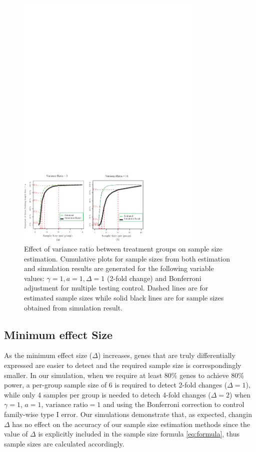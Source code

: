 \documentclass{bioinfo}
\begin{document}
\begin{figure}[h]
  \centerline{\includegraphics*[width=3.5in]{ResVarF.pdf}}
  \caption[Effect of variance ratio between treatment groups on sample size estimation]
  {Effect of variance ratio between treatment groups on sample size estimation.
    Cumulative plots for sample sizes from both estimation and simulation
    results are generated for the following variable values: $\gamma = 1, a = 1, \Delta = 1$ (2-fold
    change) and Bonferroni adjustment for multiple testing control. Dashed lines are for estimated sample sizes
    while solid black lines are for sample sizes obtained from simulation result.}
  \label{fig:ResVar}
\end{figure}

\subsection{Minimum effect Size}

As the minimum effect size ($\Delta$) increases, genes that are
truly differentially expressed are easier to detect and the required
sample size is correspondingly smaller.  In our simulation, when we
require at least 80\% genes to achieve 80\% power, a per-group
sample size of 6 is required to detect 2-fold changes ($\Delta =
1$), while only 4 samples per group is needed to detech 4-fold
changes ($\Delta = 2$) when $\gamma=1$, $a=1$, $\text{variance
ratio}=1$ and using the Bonferroni correction to control family-wise
type I error. Our simulations demonstrate that, as expected, changin
$\Delta$ has no effect on the accuracy of our sample size estimation
methods since the value of $\Delta$ is explicitly included in the
sample size formula \ref{eq:formula}, thus sample sizes are
calculated accordingly.
\end{document}

